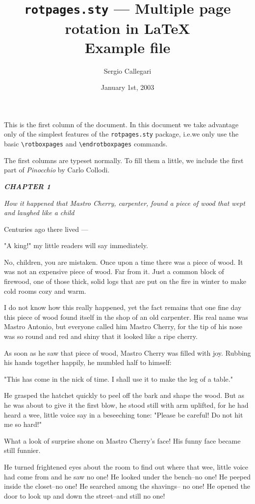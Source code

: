 \documentclass[12pt,twoside,twocolumn]{article}
\title{\texttt{rotpages.sty} --- Multiple page rotation in \LaTeX\\
  Example file}
\author{Sergio Callegari}
\date{January 1st, 2003}
\begin{document}
\sloppy
\pagestyle{fancy}
\maketitle
\thispagestyle{fancy}

This is the first column of the document. In this document we take
advantage only of the simplest features of the \texttt{rotpages.sty}
package, i.e.\@ we only use the basic \verb|\rotboxpages| and
\verb|\endrotboxpages| commands.


The first columns are typeset normally.  To fill them a little, we include
the first part of \emph{Pinocchio} by Carlo Collodi.

\bigskip
{\slshape%
  \textbf{CHAPTER 1}
  
  \emph{How it happened that Mastro Cherry, carpenter,
  found a piece of wood that wept and laughed like a child}
  \medskip
 
  Centuries ago there lived ---
  
  "A king!" my little readers will say immediately.
  
  No, children, you are mistaken.  Once upon a time
  there was a piece of wood.  It was not an expensive piece
  of wood.  Far from it.  Just a common block of firewood,
  one of those thick, solid logs that are put on the fire in
  winter to make cold rooms cozy and warm.
  
  I do not know how this really happened, yet the fact
  remains that one fine day this piece of wood found itself
  in the shop of an old carpenter.  His real name was
  Mastro Antonio, but everyone called him Mastro Cherry,
  for the tip of his nose was so round and red and shiny
  that it looked like a ripe cherry.
  
  As soon as he saw that piece of wood, Mastro Cherry
  was filled with joy.  Rubbing his hands together happily,
  he mumbled half to himself:
  
  "This has come in the nick of time.  I shall use it to
  make the leg of a table."
  
  He grasped the hatchet quickly to peel off the bark and
  shape the wood.  But as he was about to give it the first
  blow, he stood still with arm uplifted, for he had heard a
  wee, little voice say in a beseeching tone:  "Please be careful!
  Do not hit me so hard!"
  
  What a look of surprise shone on Mastro Cherry's
  face!  His funny face became still funnier.
  
  He turned frightened eyes about the room to find out
  where that wee, little voice had come from and he saw
  no one! He looked under the bench--no one! He peeped
  inside the closet--no one! He searched among the shavings--
  no one! He opened the door to look up and down
  the street--and still no one!

}
\end{document}
